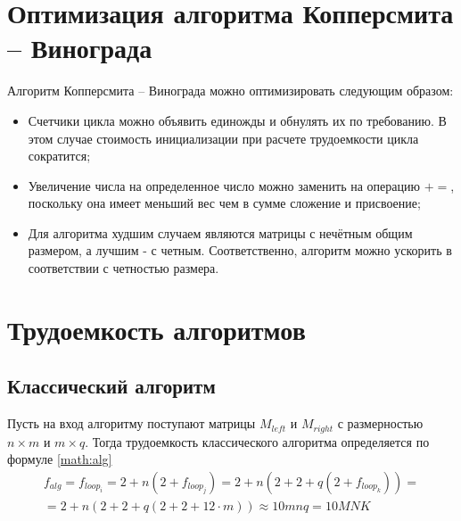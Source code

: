 \section{Оптимизация алгоритма Копперсмита -- Винограда}\label{sect:optimize}
Алгоритм Копперсмита -- Винограда можно оптимизировать следующим образом:
\begin{itemize}
	\item Счетчики цикла можно объявить единожды и обнулять их по требованию. В этом случае стоимость инициализации при расчете трудоемкости цикла сократится;
	\item Увеличение числа на определенное число можно заменить на операцию $+=$, поскольку она имеет меньший вес чем в сумме сложение и присвоение;
	\item Для алгоритма худшим случаем являются матрицы с нечётным общим размером, а лучшим - с четным. Соответственно, алгоритм можно ускорить в соответствии с четностью размера.
\end{itemize}

\section{Трудоемкость алгоритмов}

\subsection{Классический алгоритм}

Пусть на вход алгоритму поступают матрицы $M_{left}$ и $M_{right}$ с размерностью $n \times m$ и $m \times q$. Тогда трудоемкость классического алгоритма определяется по формуле \ref{math:alg}
\begin{multline}\label{math:alg}
	f_{alg} = f_{loop_i} = 2 + n\left(2 + f_{loop_j}\right) = 2 + n\left(2 + 2 + q\left(2 + f_{loop_k}\right)\right) = \\
	= 2 + n\left(2 + 2 + q\left(2 + 2 + 12 \cdot m\right)\right) \approx 10mnq = 10MNK
\end{multline}
